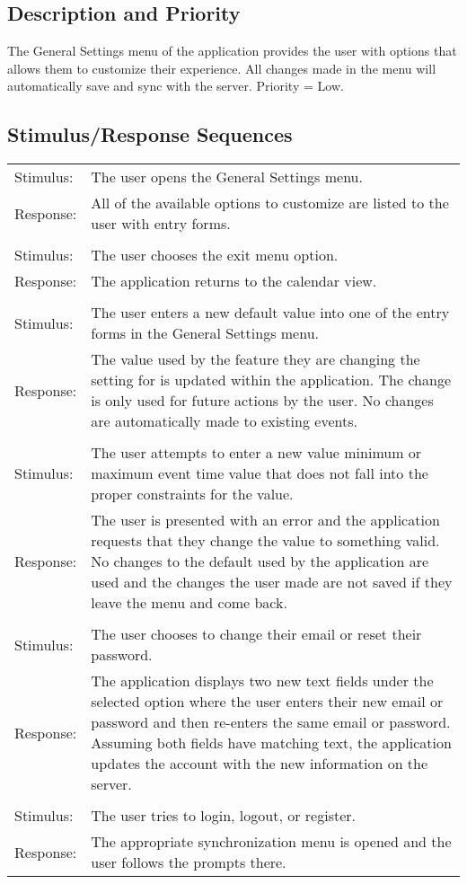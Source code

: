 \documentclass{scrreprt}
\begin{document}
\subsection{Description and Priority}
The General Settings menu of the application provides the user with options that allows them to customize their experience. All changes made in the menu will automatically save and sync with the server. Priority = Low.

\subsection{Stimulus/Response Sequences}
\begin{center}
\begin{longtable}{ p{2cm} p{13cm} }
Stimulus: & The user opens the General Settings menu. \\
Response: & All of the available options to customize are listed to the user with entry forms. \\
\\
Stimulus: & The user chooses the exit menu option. \\
Response: & The application returns to the calendar view. \\
\\
Stimulus: & The user enters a new default value into one of the entry forms in the General Settings menu. \\
Response: & The value used by the feature they are changing the setting for is updated within the application. The change is only used for future actions by the user.  No changes are automatically made to existing events. \\
\\
Stimulus: & The user attempts to enter a new value minimum or maximum event time value that does not fall into the proper constraints for the value. \\
Response: & The user is presented with an error and the application requests that they change the value to something valid.  No changes to the default used by the application are used and the changes the user made are not saved if they leave the menu and come back. \\
\\
Stimulus: & The user chooses to change their email or reset their password. \\
Response: & The application displays two new text fields under the selected option where the user enters their new email or password and then re-enters the same email or password.  Assuming both fields have matching text, the application updates the account with the new information on the server. \\
\\
Stimulus: & The user tries to login, logout, or register. \\
Response: & The appropriate synchronization menu is opened and the user follows the prompts there. \\
\end{longtable}
\end{center}
\end{document}
